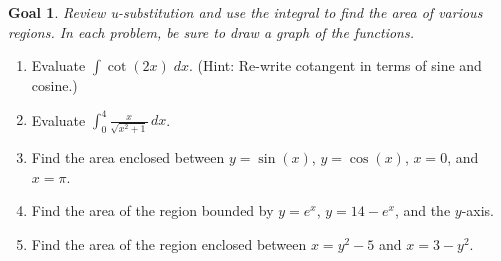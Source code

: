 \documentclass[12pt]{article}
\newtheorem*{goal}{Goal}
\begin{document}
\newpage

\begin{goal} \rm
Review u-substitution and use the integral to find the area of various regions. In each problem, be sure to draw a graph of the functions.
\end{goal}

\begin{enumerate}

\item Evaluate $\displaystyle \int \cot(2x) \; dx$.  (Hint: Re-write cotangent in terms of sine and cosine.)

\vspace{1in}

\item Evaluate $\displaystyle \int_0^4 \frac{x}{\sqrt{x^2 + 1}} \, dx$.

\vspace{1in}


\item Find the area enclosed between $y=\sin(x)$, $y=\cos(x)$, $x=0$, and $x=\pi$.

\vspace{2in}

\item Find the area of the region bounded by $y=e^x$, $y=14-e^x$, and the $y$-axis.



\vspace{2in}

\item Find the area of the region enclosed between $x=y^2-5$ and $x=3-y^2$. 

\vspace{2in}

\end{enumerate}
\end{document}
